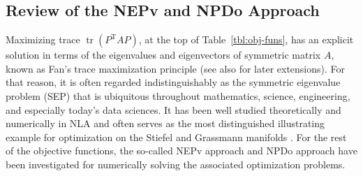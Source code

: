 \documentclass[11pt]{article}
\DeclareMathOperator{\tr}{tr}
\DeclareMathOperator{\T}{T}
\theoremstyle{definition}
\numberwithin{equation}{section}
\begin{document}
\subsection{Review of the NEPv and NPDo Approach}
Maximizing trace $\tr(P^{\T}AP)$, at the top of  Table~\ref{tbl:obj-funs}, has an explicit solution in terms
of the eigenvalues and eigenvectors of symmetric matrix $A$,
known as Fan's trace maximization principle \cite{fan:1949} \cite[p.248]{hojo:2013} (see also \cite{lilb:2013,liwz:2023,lili:2024} for later extensions). For that reason, it is often regarded indistinguishably as the symmetric eigenvalue problem (SEP)
that is ubiquitous throughout mathematics, science, engineering, and especially today's data sciences.
It has been well studied theoretically and numerically in NLA
\cite{demm:1997,govl:2013,li:2015,parl:1998,rutt:1994,saad:1992}
and often serves as the most distinguished illustrating example for optimization on the Stiefel and Grassmann manifolds
\cite{abms:2008,edas:1999}.
For the rest of
the objective functions, the so-called
NEPv approach and NPDo
approach have been investigated for numerically solving the associated optimization problems.
\end{document}

